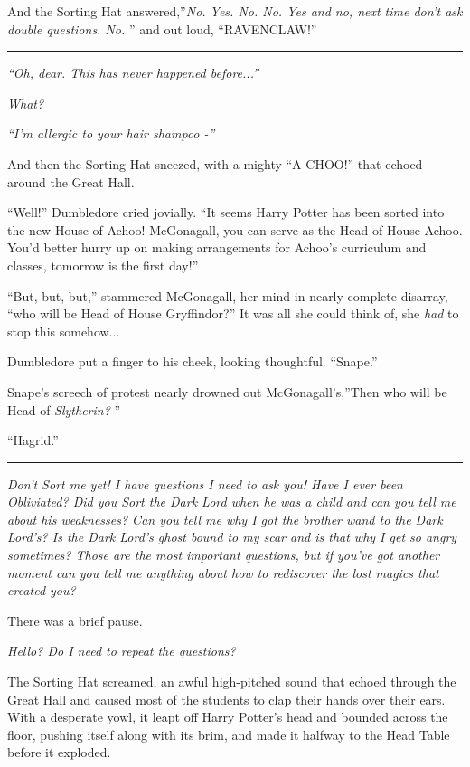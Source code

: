 And the Sorting Hat answered,''\emph{No. Yes. No. No. Yes and no, next
time don't ask double questions. No.} '' and out loud, ``RAVENCLAW!''

\begin{center}\rule{3in}{0.4pt}\end{center}

\emph{``Oh, dear. This has never happened before...''}

\emph{What?}

\emph{``I'm allergic to your hair shampoo -''}

And then the Sorting Hat sneezed, with a mighty ``A-CHOO!'' that echoed
around the Great Hall.

``Well!'' Dumbledore cried jovially. ``It seems Harry Potter has been
sorted into the new House of Achoo! McGonagall, you can serve as the
Head of House Achoo. You'd better hurry up on making arrangements for
Achoo's curriculum and classes, tomorrow is the first day!''

``But, but, but,'' stammered McGonagall, her mind in nearly complete
disarray, ``who will be Head of House Gryffindor?'' It was all she could
think of, she \emph{had} to stop this somehow...

Dumbledore put a finger to his cheek, looking thoughtful. ``Snape.''

Snape's screech of protest nearly drowned out McGonagall's,''Then who
will be Head of \emph{Slytherin?} ''

``Hagrid.''

\begin{center}\rule{3in}{0.4pt}\end{center}

\emph{Don't Sort me yet! I have questions I need to ask you! Have I ever
been Obliviated? Did you Sort the Dark Lord when he was a child and can
you tell me about his weaknesses? Can you tell me why I got the brother
wand to the Dark Lord's? Is the Dark Lord's ghost bound to my scar and
is that why I get so angry sometimes? Those are the most important
questions, but if you've got another moment can you tell me anything
about how to rediscover the lost magics that created you?}

There was a brief pause.

\emph{Hello? Do I need to repeat the questions?}

The Sorting Hat screamed, an awful high-pitched sound that echoed
through the Great Hall and caused most of the students to clap their
hands over their ears. With a desperate yowl, it leapt off Harry
Potter's head and bounded across the floor, pushing itself along with
its brim, and made it halfway to the Head Table before it exploded.


